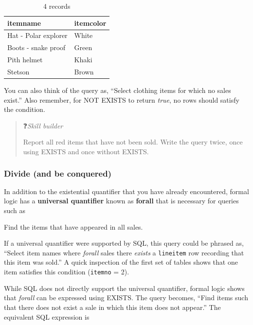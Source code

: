 \documentclass[
]{article}
\begin{document}
\begin{table}

\caption{\label{tab:unnamed-chunk-66}4 records}
\centering
\begin{tabular}[t]{l|l}
\hline
itemname & itemcolor\\
\hline
Hat - Polar explorer & White\\
\hline
Boots - snake proof & Green\\
\hline
Pith helmet & Khaki\\
\hline
Stetson & Brown\\
\hline
\end{tabular}
\end{table}

You can also think of the query as, ``Select clothing items for which no sales exist.'' Also remember, for NOT EXISTS to return \emph{true}, no rows should satisfy the condition.

\begin{quote}
❓\emph{Skill builder}

Report all red items that have not been sold. Write the query twice, once using EXISTS and once without EXISTS.
\end{quote}

\hypertarget{divide-and-be-conquered}{%
\subsubsection*{Divide (and be conquered)}\label{divide-and-be-conquered}}

In addition to the existential quantifier that you have already encountered, formal logic has a \textbf{universal quantifier} known as \textbf{forall} that is necessary for queries such as

Find the items that have appeared in all sales.

If a universal quantifier were supported by SQL, this query could be phrased as, ``Select item names where \emph{forall} sales there \emph{exists} a \texttt{lineitem} row recording that this item was sold.'' A quick inspection of the first set of tables shows that one item satisfies this condition (\texttt{itemno} = 2).

While SQL does not directly support the universal quantifier, formal logic shows that \emph{forall} can be expressed using EXISTS. The query becomes, ``Find items such that there does not exist a sale in which this item does not appear.'' The equivalent SQL expression is
\end{document}
